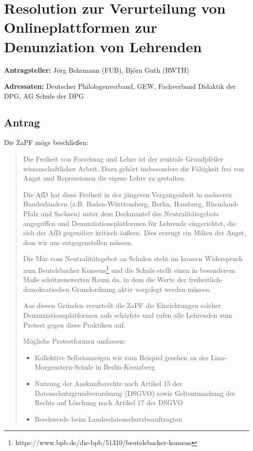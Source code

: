 \documentclass[draft,10pt,oneside]{scrartcl}
\begin{document}
\section*{Resolution zur Verurteilung von Onlineplattformen zur Denunziation
von Lehrenden}

\textbf{Antragsteller:} Jörg Behrmann (FUB), Björn Guth (RWTH)

\textbf{Adressaten:} Deutscher Philologenverband, GEW, Fachverband Didaktik der
DPG, AG Schule der DPG

\subsection*{Antrag}

Die ZaPF möge beschließen:

\begin{quote} Die Freiheit von Forschung und Lehre ist der zentrale
    Grundpfeiler wissenschaftlicher Arbeit. Dazu gehört insbesondere die
    Fähigkeit frei von Angst und Repressionen die eigene Lehre zu gestalten.

    Die AfD hat diese Freiheit in der jüngeren Vergangenheit in mehreren
    Bundesländern (z.B. Baden-Württemberg, Berlin, Hamburg, Rheinland-Pfalz und
    Sachsen) unter dem Deckmantel des Neutralitätsgebots angegriffen und
    Denunziationsplatformen für Lehrende eingerichtet, die sich der AfD
    gegenüber kritisch äußern. Dies erzeugt ein Milieu der Angst, dem wir uns
    entgegenstellen müssen.

    Die Mär vom Neutralitätsgebot an Schulen steht im krassen
    Widerspruch zum Beutelsbacher
    Konsens\footnote{https://www.bpb.de/die-bpb/51310/beutelsbacher-konsens}
    und die Schule stellt einen in besonderem Maße schützenswerten Raum da, in
    dem die Werte der freiheitlich-demokratischen Grundordnung aktiv vorgelegt
    werden müssen.

    Aus diesen Gründen verurteilt die ZaPF die Einrichtungen solcher
    Denunziationsplatformen aufs schärfste und rufen alle Lehrenden zum Protest
    gegen diese Praktiken auf.

    Mögliche Protestformen umfassen:

    \begin{itemize}
        \item Kollektive Selbstanzeigen wie zum Beispiel gesehen an der
            Lina-Morgenstern-Schule in Berlin-Kreuzberg
        \item Nutzung der Auskunftsrechte nach Artikel 15 der
            Datenschutzgrundverordnung (DSGVO) sowie Geltentmachung des Rechts auf
            Löschung nach Artikel 17 der DSGVO
        \item Beschwerde beim Landesdatenschutzbeauftragten
    \end{itemize}
\end{quote}
\end{document}
